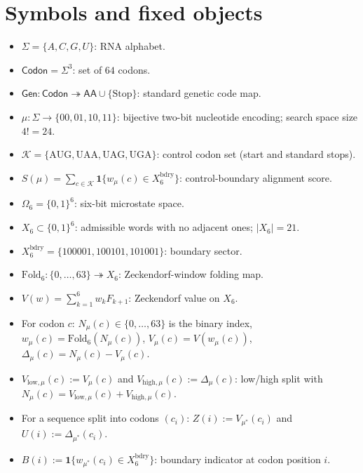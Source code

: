 \section{Symbols and fixed objects}
\label{app:symbols}

\begin{itemize}
\item $\Sigma=\{A,C,G,U\}$: RNA alphabet.
\item $\mathsf{Codon}=\Sigma^3$: set of $64$ codons.
\item $\mathsf{Gen}:\mathsf{Codon}\twoheadrightarrow \mathsf{AA}\cup\{\mathrm{Stop}\}$: standard genetic code map.
\item $\mu:\Sigma\to\{00,01,10,11\}$: bijective two-bit nucleotide encoding; search space size $4!=24$.
\item $\mathcal{K}=\{\mathrm{AUG,UAA,UAG,UGA}\}$: control codon set (start and standard stops).
\item $S(\mu)=\sum_{c\in\mathcal{K}}\mathbf{1}\{w_\mu(c)\in X_6^{\mathrm{bdry}}\}$: control-boundary alignment score.
\item $\Omega_6=\{0,1\}^6$: six-bit microstate space.
\item $X_6\subset\{0,1\}^6$: admissible words with no adjacent ones; $|X_6|=21$.
\item $X_6^{\mathrm{bdry}}=\{100001,100101,101001\}$: boundary sector.
\item $\mathrm{Fold}_6:\{0,\dots,63\}\twoheadrightarrow X_6$: Zeckendorf-window folding map.
\item $V(w)=\sum_{k=1}^6 w_k F_{k+1}$: Zeckendorf value on $X_6$.
\item For codon $c$: $N_\mu(c)\in\{0,\dots,63\}$ is the binary index, $w_\mu(c)=\mathrm{Fold}_6(N_\mu(c))$, $V_\mu(c)=V(w_\mu(c))$, $\Delta_\mu(c)=N_\mu(c)-V_\mu(c)$.
\item $V_{\mathrm{low},\mu}(c):=V_\mu(c)$ and $V_{\mathrm{high},\mu}(c):=\Delta_\mu(c)$: low/high split with $N_\mu(c)=V_{\mathrm{low},\mu}(c)+V_{\mathrm{high},\mu}(c)$.
\item For a sequence split into codons $(c_i)$: $Z(i):=V_{\mu^\ast}(c_i)$ and $U(i):=\Delta_{\mu^\ast}(c_i)$.
\item $B(i):=\mathbf{1}\{w_{\mu^\ast}(c_i)\in X_6^{\mathrm{bdry}}\}$: boundary indicator at codon position $i$.
\end{itemize}


